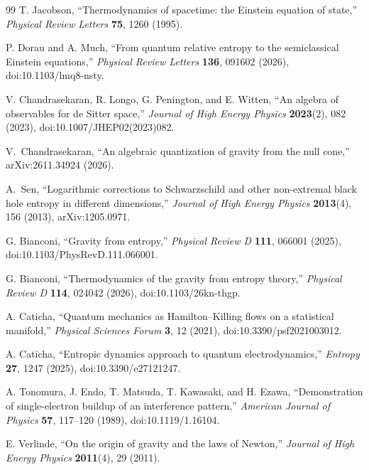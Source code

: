 \documentclass[11pt]{article}
\begin{document}
\begin{thebibliography}{99}
T. Jacobson,
``Thermodynamics of spacetime: the Einstein equation of state,''
\emph{Physical Review Letters} \textbf{75}, 1260 (1995).

P. Dorau and A. Much,
``From quantum relative entropy to the semiclassical Einstein equations,''
\emph{Physical Review Letters} \textbf{136}, 091602 (2026),
doi:10.1103/lmq8-nsty.

V. Chandrasekaran, R. Longo, G. Penington, and E. Witten,
``An algebra of observables for de Sitter space,''
\emph{Journal of High Energy Physics} \textbf{2023}(2), 082 (2023),
doi:10.1007/JHEP02(2023)082.

V.~Chandrasekaran,
``An algebraic quantization of gravity from the null cone,''
arXiv:2611.34924 (2026).

A.~Sen,
``Logarithmic corrections to Schwarzschild and other non-extremal black hole entropy in different dimensions,''
\emph{Journal of High Energy Physics} \textbf{2013}(4), 156 (2013), arXiv:1205.0971.

G. Bianconi,
``Gravity from entropy,''
\emph{Physical Review D} \textbf{111}, 066001 (2025),
doi:10.1103/PhysRevD.111.066001.

G. Bianconi,
``Thermodynamics of the gravity from entropy theory,''
\emph{Physical Review D} \textbf{114}, 024042 (2026),
doi:10.1103/26kn-thgp.

A. Caticha,
``Quantum mechanics as Hamilton--Killing flows on a statistical manifold,''
\emph{Physical Sciences Forum} \textbf{3}, 12 (2021),
doi:10.3390/psf2021003012.

A. Caticha,
``Entropic dynamics approach to quantum electrodynamics,''
\emph{Entropy} \textbf{27}, 1247 (2025),
doi:10.3390/e27121247.

A. Tonomura, J. Endo, T. Matsuda, T. Kawasaki, and H. Ezawa,
``Demonstration of single-electron buildup of an interference pattern,''
\emph{American Journal of Physics} \textbf{57}, 117--120 (1989),
doi:10.1119/1.16104.

E. Verlinde,
``On the origin of gravity and the laws of Newton,''
\emph{Journal of High Energy Physics} \textbf{2011}(4), 29 (2011).


\end{thebibliography}
\end{document}
